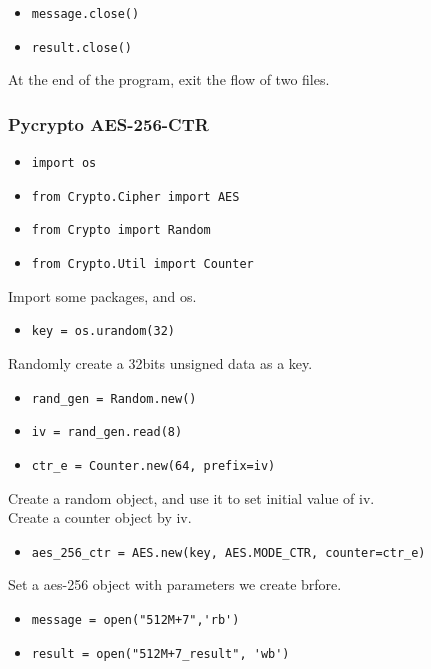 \documentclass{article}
\begin{document}
\begin{itemize}
\item \verb|message.close()|
\item \verb|result.close()|
\end{itemize}

\noindent At the end of the program, exit the flow of two files.\\

\subsubsection{Pycrypto AES-256-CTR}

\begin{itemize}
\item \verb|import os|
\item \verb|from Crypto.Cipher import AES|
\item \verb|from Crypto import Random|
\item \verb|from Crypto.Util import Counter|
\end{itemize}

\noindent Import some packages, and os.

\begin{itemize}
\item \verb|key = os.urandom(32)|
\end{itemize}

\noindent Randomly create a 32bits unsigned data as a key.

\begin{itemize}
\item \verb|rand_gen = Random.new()|
\item \verb|iv = rand_gen.read(8)|
\item \verb|ctr_e = Counter.new(64, prefix=iv)|
\end{itemize}

\noindent Create a random object, and use it to set initial value of iv.\\
Create a counter object by iv.

\begin{itemize}
\item \verb|aes_256_ctr = AES.new(key, AES.MODE_CTR, counter=ctr_e)|
\end{itemize}

\noindent Set a aes-256 object with parameters we create brfore.

\begin{itemize}
\item \verb|message = open("512M+7",'rb')|
\item \verb|result = open("512M+7_result", 'wb')|
\end{itemize}
 
\end{document}
